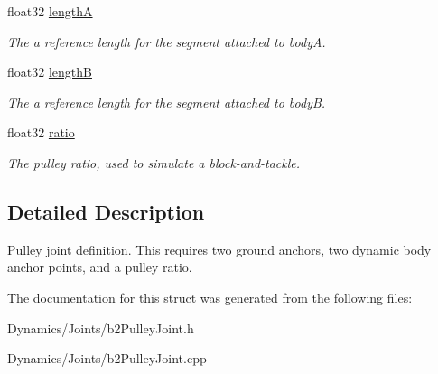 \begin{DoxyCompactItemize}
float32 \mbox{\hyperlink{structb2PulleyJointDef_a51d945882c1d7a78af2b0e9ffb31a33b}{lengthA}}
\begin{DoxyCompactList}\small\item\em The a reference length for the segment attached to bodyA. \end{DoxyCompactList}\item 
\mbox{\label{structb2PulleyJointDef_a5857d5b5b9880b6c8201ce3ee8c3eef0}} 
float32 \mbox{\hyperlink{structb2PulleyJointDef_a5857d5b5b9880b6c8201ce3ee8c3eef0}{lengthB}}
\begin{DoxyCompactList}\small\item\em The a reference length for the segment attached to bodyB. \end{DoxyCompactList}\item 
\mbox{\label{structb2PulleyJointDef_af35074246aeacbf239c11682642b31f5}} 
float32 \mbox{\hyperlink{structb2PulleyJointDef_af35074246aeacbf239c11682642b31f5}{ratio}}
\begin{DoxyCompactList}\small\item\em The pulley ratio, used to simulate a block-\/and-\/tackle. \end{DoxyCompactList}\end{DoxyCompactItemize}


\subsection{Detailed Description}
Pulley joint definition. This requires two ground anchors, two dynamic body anchor points, and a pulley ratio. 

The documentation for this struct was generated from the following files\+:\begin{DoxyCompactItemize}
\item 
Dynamics/\+Joints/b2\+Pulley\+Joint.\+h\item 
Dynamics/\+Joints/b2\+Pulley\+Joint.\+cpp\end{DoxyCompactItemize}
